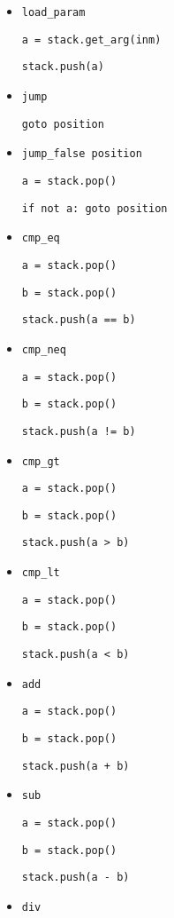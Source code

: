 \begin{itemize}
\item \texttt{load\_param}

  \texttt{a = stack.get\_arg(inm)}

  \texttt{stack.push(a)}

\item \texttt{jump}

  \texttt{goto position}

\item \texttt{jump\_false position}

  \texttt{a = stack.pop()}

  \texttt{if not a: goto position}

\item \texttt{cmp\_eq}

  \texttt{a = stack.pop()}

  \texttt{b = stack.pop()}

  \texttt{stack.push(a == b)}

\item \texttt{cmp\_neq}

  \texttt{a = stack.pop()}

  \texttt{b = stack.pop()}

  \texttt{stack.push(a != b)}

\item \texttt{cmp\_gt}

  \texttt{a = stack.pop()}

  \texttt{b = stack.pop()}

  \texttt{stack.push(a > b)}

\item \texttt{cmp\_lt}

  \texttt{a = stack.pop()}

  \texttt{b = stack.pop()}

  \texttt{stack.push(a < b)}

\item \texttt{add}

  \texttt{a = stack.pop()}

  \texttt{b = stack.pop()}

  \texttt{stack.push(a + b)}

\item \texttt{sub}

  \texttt{a = stack.pop()}

  \texttt{b = stack.pop()}

  \texttt{stack.push(a - b)}

\item \texttt{div}
  

\end{itemize}
